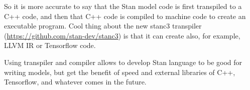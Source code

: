 \documentclass[a4paper,11pt,english]{article}
\begin{document}
So it is more accurate to say that the Stan model code is first transpiled to a C++ code, and then that C++ code is compiled to machine code to create an executable program. Cool thing about the new stanc3 transpiler (\url{https://github.com/stan-dev/stanc3}) is that it can create also, for example, LLVM IR or Tensorflow code.

Using transpiler and compiler allows to develop Stan language to be good for writing models, but get the benefit of speed and external libraries of C++, Tensorflow, and whatever comes in the future.
\end{document}
